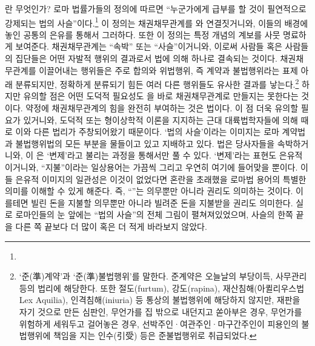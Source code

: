 란 무엇인가?
로마 법률가들의 정의에 따르면
``누군가에게 급부를 할 것이 필연적으로 강제되는
법의 사슬''이다.\footnote{%
   }
이 정의는
채권채무관계를 와 연결짓거니와,
이들의 배경에 놓인 공통의 은유를 통해서 그러하다.
또한 이 정의는
특정 개념의 계보를 사뭇 명료하게 보여준다.
채권채무관계는 ``속박'' 또는 ``사슬''이거니와,
이로써
사람들 혹은 사람들의 집단들은
어떤 자발적 행위의 결과로서
법에 의해 하나로 결속되는 것이다.
채권채무관계를 이끌어내는 행위들은 주로
합의와 위법행위, 즉
계약과 불법행위라는 표제 아래 분류되지만,
정확하게 분류되기 힘든 여러 다른 행위들도 유사한 결과를 낳는다.\footnote{%
  `준(準)계약'과 `준(準)불법행위'를 말한다.
  준계약은 오늘날의 부당이득, 사무관리 등의 법리에 해당한다.
  또한 절도(furtum), 강도(rapina), 재산침해(아퀼리우스법\,Lex Aquilia),
  인격침해(iniuria) 등 통상의 불법행위에 해당하지 않지만,
  재판을 자기 것으로 만든 심판인,
  무언가를 집 밖으로 내던지고 쏟아부은 경우,
  무언가를 위험하게 세워두고 걸어놓은 경우,
  선박주인^^b7여관주인^^b7마구간주인이 피용인의 불법행위에 책임을 지는 인수(引受)
  등은 준불법행위로 취급되었다.  }
하지만 유의할 점은
어떤 도덕적 필요성도 을 바로 채권채무관계로 만들지는 못한다는 것이다.
약정에 채권채무관계의 힘을 완전히 부여하는 것은 법이다.
이 점 더욱 유의할 필요가 있거니와,
도덕적 또는 형이상학적 이론을 지지하는 근대 대륙법학자들에 의해
때로 이와 다른 법리가 주창되어왔기 때문이다.
`법의 사슬'이라는 이미지는
로마 계약법과 불법행위법의 모든 부분을 물들이고 있고 지배하고 있다.
법은 당사자들을 속박하거니와,
이 은 `변제'라고 불리는 과정을
통해서만 풀 수 있다.
`변제'라는 표현도 은유적이거니와,
``지불''이라는 일상용어는 가끔씩 그리고 우연히
여기에 들어맞을 뿐이다.
이들 은유적 이미지의 일관성은
이것이 없었다면 혼란을 초래했을
로마법 용어의 특별한 의미를 이해할 수 있게 해준다.
즉, ``''는 의무뿐만 아니라
권리도 의미하는 것이다.
이를테면 빌린 돈을 지불할 의무뿐만 아니라
빌려준 돈을 지불받을 권리도 의미한다.
실로 로마인들의 눈 앞에는 ``법의 사슬''의 전체 그림이
펼쳐져있었으며,
사슬의 한쪽 끝을 다른 쪽 끝보다 더 많이 혹은 더 적게
바라보지 않았다.

